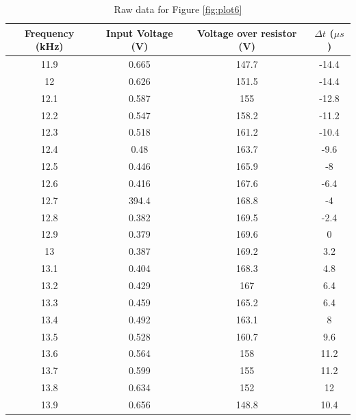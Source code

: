 \documentclass{article}
\begin{document}
\begin{table}[H]
    \centering
    \begin{tabular}{c|c|c|c}
        Frequency (kHz) & Input Voltage (V) & Voltage over resistor (V) &
        $\Delta t$ ($\mu s$) \\
        \hline
        11.9	&	0.665	&	147.7	&	-14.4	\\
        12	&	0.626	&	151.5	&	-14.4	\\
        12.1	&	0.587	&	155	&	-12.8	\\
        12.2	&	0.547	&	158.2	&	-11.2	\\
        12.3	&	0.518	&	161.2	&	-10.4	\\
        12.4	&	0.48	&	163.7	&	-9.6	\\
        12.5	&	0.446	&	165.9	&	-8	\\
        12.6	&	0.416	&	167.6	&	-6.4	\\
        12.7	&	394.4	&	168.8	&	-4	\\
        12.8	&	0.382	&	169.5	&	-2.4	\\
        12.9	&	0.379	&	169.6	&	0	\\
        13	&	0.387	&	169.2	&	3.2	\\
        13.1	&	0.404	&	168.3	&	4.8	\\
        13.2	&	0.429	&	167	&	6.4	\\
        13.3	&	0.459	&	165.2	&	6.4	\\
        13.4	&	0.492	&	163.1	&	8	\\
        13.5	&	0.528	&	160.7	&	9.6	\\
        13.6	&	0.564	&	158	&	11.2	\\
        13.7	&	0.599	&	155	&	11.2	\\
        13.8	&	0.634	&	152	&	12	\\
        13.9	&	0.656	&	148.8	&	10.4	    
    \end{tabular}
    \caption{Raw data for Figure \ref{fig:plot6}}
    \label{fig:t6}
\end{table}
\end{document}
